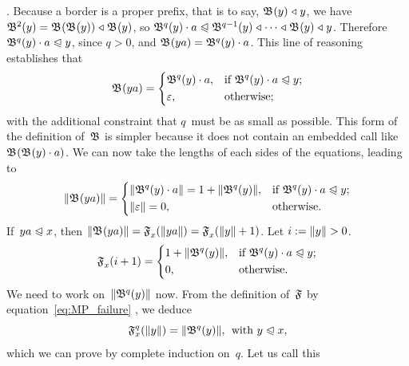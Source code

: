 \prefeq {}\). Because a border is a proper prefix, that
is to say, \(\mathfrak{B}^{}(y) \mathrel{\triangleleft} y\), we have \(\mathfrak{B}^{2}(y) =
\mathfrak{B}^{}(\mathfrak{B}^{}(y)) \mathrel{\triangleleft} \mathfrak{B}^{}(y)\), so \(\Border{q}{y} \cdot
a \prefeq \Border{q-1}{y} \pref \dots \pref \Border{}{y} \pref
y\). Therefore \(\mathfrak{B}^{q}(y) \cdot a \mathrel{\trianglelefteqslant} y\), since \({q > 0}\),
and \(\mathfrak{B}^{}(ya) = \mathfrak{B}^{q}(y) \cdot a\). This line of reasoning
establishes that
\begin{equation*}
\mathfrak{B}^{}(ya) =
\left\{
  \begin{aligned}
   & \mathfrak{B}^{q}(y) \cdot a,
   && \text{if \(\mathfrak{B}^{q}(y) \cdot a \mathrel{\trianglelefteqslant}y\)};\\
   & \varepsilon,
   && \text{otherwise;}
  \end{aligned}
\right.
\end{equation*}
with the additional constraint that \(q\)~must be as small as
possible. This form of the definition of~\(\mathfrak{B}\) is simpler
because it does not contain an embedded call like
\(\mathfrak{B}^{}(\mathfrak{B}^{}(y) \cdot a)\). We can now take the lengths of
each sides of the equations, leading to
\begin{equation*}
\lVert{\mathfrak{B}^{}(ya)}\rVert{} =
\left\{
  \begin{aligned}
   & \lVert{\mathfrak{B}^{q}(y) \cdot a}\rVert{} = 1 + \lVert{\mathfrak{B}^{q}(y)}\rVert{},
   && \text{if \(\mathfrak{B}^{q}(y) \cdot a \mathrel{\trianglelefteqslant}y\)};\\
   & \lVert{\varepsilon}\rVert{} = 0,
   && \text{otherwise.}
  \end{aligned}
\right.
\end{equation*}
If~\({ya \mathrel{\trianglelefteqslant} x}\), then \(\lVert{\mathfrak{B}^{}(ya)}\rVert{} =
\mathfrak{F}_{x}^{}(\lVert{ya}\rVert{}) = \mathfrak{F}_{x}^{}(\lVert{y}\rVert{}+1)\). Let \(i :=
\lVert{y}\rVert{} > 0\).
\begin{equation*}
\mathfrak{F}_{x}^{}(i+1) =
\left\{
  \begin{aligned}
   & 1 + \lVert{\mathfrak{B}^{q}(y)}\rVert{},
   && \text{if \(\mathfrak{B}^{q}(y) \cdot a \mathrel{\trianglelefteqslant}y\)};\\
   & 0,
   && \text{otherwise.}
  \end{aligned}
\right.
\end{equation*}
We need to work on~\(\lVert{\mathfrak{B}^{q}(y)}\rVert{}\) now. From the definition
of~\(\mathfrak{F}\) by equation~\eqref{eq:MP_failure}
, we deduce
\begin{equation}
\mathfrak{F}_{x}^{q}(\lVert{y}\rVert{}) = \lVert{\mathfrak{B}^{q}(y)}\rVert{},
\,\; \text{with \(y \mathrel{\trianglelefteqslant}x\)},
\label{eq:MP_failure_p}
\end{equation}
which we can prove by complete induction on~\(q\). Let us call this
